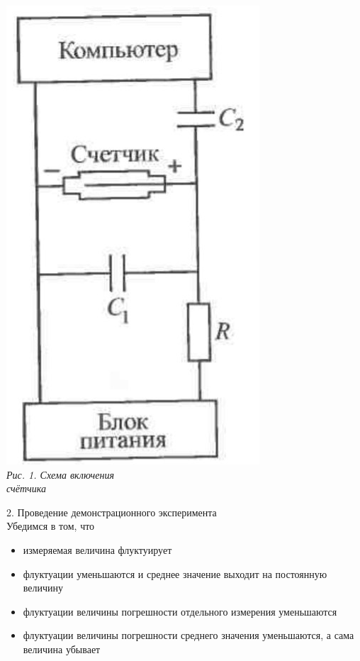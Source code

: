 \documentclass[12pt, a4paper]{article}
\begin{document}
        \begin{minipage}[c]{0.32\textwidth}
            \begin{center}
                \includegraphics[scale=0.6]{Pics/scheme.jpg} \\
                \textit{\textcolor[HTML]{000000}{Рис. 1. Схема включения \\ счётчика}}
            \end{center}
        \end{minipage}

        \newpage

        {\Large 2. Проведение демонстрационного эксперимента \\}
        Убедимся в том, что 
        \begin{itemize}
            \item измеряемая величина флуктуирует
            \item флуктуации уменьшаются и среднее значение выходит на постоянную величину
            \item флуктуации величины погрешности отдельного измерения уменьшаются
            \item флуктуации величины погрешности среднего значения уменьшаются, а сама величина убывает
          \end{itemize}
\end{document}
